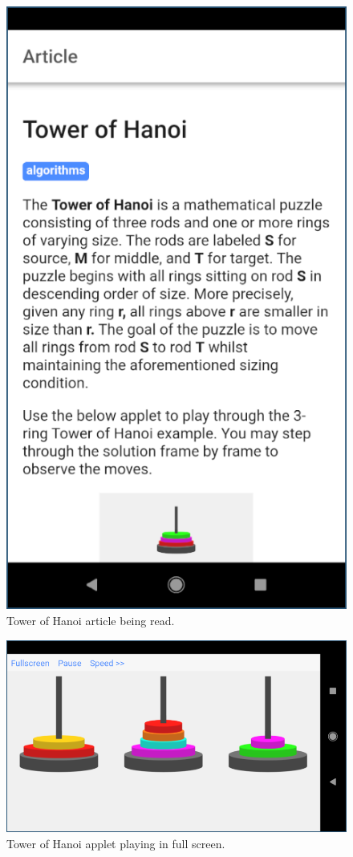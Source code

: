 \documentclass[12pt]{report}
\begin{document}
\begin{figure}
    \centering
    \includegraphics[scale=0.5]{images/avd-articles-tower.png}
    \caption{Tower of Hanoi article being read.}
    \label{fig:avd-articles-tower}
\end{figure}

\begin{figure}
    \centering
    \includegraphics[scale=0.5]{images/avd-hanoi-fullscreen.png}
    \caption{Tower of Hanoi applet playing in full screen.}
    \label{fig:avd-hanoi-fullscreen}
\end{figure}
\end{document}
